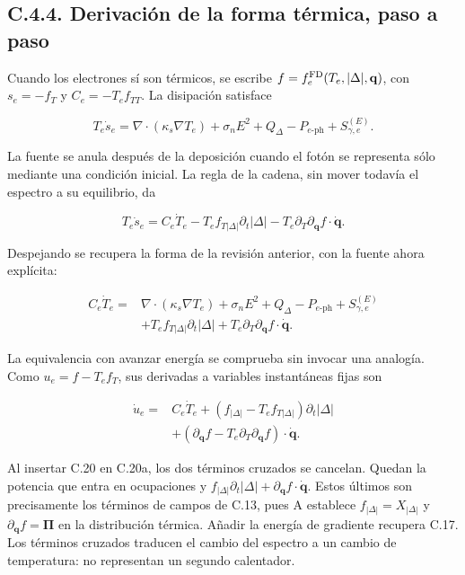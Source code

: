 \documentclass[
  spanish,
  10pt,
  a4paper,
]{article}
\begin{document}
\subsection{C.4.4. Derivación de la forma térmica, paso a
paso}\label{c.4.4.-derivaciuxf3n-de-la-forma-tuxe9rmica-paso-a-paso}

Cuando los electrones sí son térmicos, se escribe
\(f=f_e^{\rm FD}(T_e,|\Delta|,\mathbf q)\), con \(s_e=-f_T\) y
\(C_e=-T_ef_{TT}\). La disipación satisface

\[
T_e\dot s_e=\nabla\cdot(\kappa_s\nabla T_e)
+\sigma_nE^2+Q_\Delta-P_{e\text{-ph}}+S_{\gamma,e}^{(E)}.
\tag{C.19}
\]

La fuente se anula después de la deposición cuando el fotón se
representa sólo mediante una condición inicial. La regla de la cadena,
sin mover todavía el espectro a su equilibrio, da

\[
T_e\dot s_e=C_e\dot T_e
-T_ef_{T|\Delta|}\partial_t|\Delta|
-T_e\partial_T\partial_{\mathbf q}f\cdot\dot{\mathbf q}.
\tag{C.19a}
\]

Despejando se recupera la forma de la revisión anterior, con la fuente
ahora explícita:

\[
\boxed{\begin{aligned}
C_e\dot T_e={}&\nabla\cdot(\kappa_s\nabla T_e)
+\sigma_nE^2+Q_\Delta-P_{e\text{-ph}}+S_{\gamma,e}^{(E)}\\
&+T_ef_{T|\Delta|}\partial_t|\Delta|
+T_e\partial_T\partial_{\mathbf q}f\cdot\dot{\mathbf q}.
\end{aligned}}\tag{C.20}
\]

La equivalencia con avanzar energía se comprueba sin invocar una
analogía. Como \(u_e=f-T_ef_T\), sus derivadas a variables instantáneas
fijas son

\[
\begin{aligned}
\dot u_e={}&C_e\dot T_e
+(f_{|\Delta|}-T_ef_{T|\Delta|})\partial_t|\Delta|\\
&+(\partial_{\mathbf q}f-T_e\partial_T\partial_{\mathbf q}f)
\cdot\dot{\mathbf q}.
\end{aligned}\tag{C.20a}
\]

Al insertar C.20 en C.20a, los dos términos cruzados se cancelan. Quedan
la potencia que entra en ocupaciones y
\(f_{|\Delta|}\partial_t|\Delta|+\partial_{\mathbf q}f\cdot\dot{\mathbf q}\).
Estos últimos son precisamente los términos de campos de C.13, pues A
establece \(f_{|\Delta|}=X_{|\Delta|}\) y
\(\partial_{\mathbf q}f=\boldsymbol\Pi\) en la distribución térmica.
Añadir la energía de gradiente recupera C.17. Los términos cruzados
traducen el cambio del espectro a un cambio de temperatura: no
representan un segundo calentador.
\end{document}
